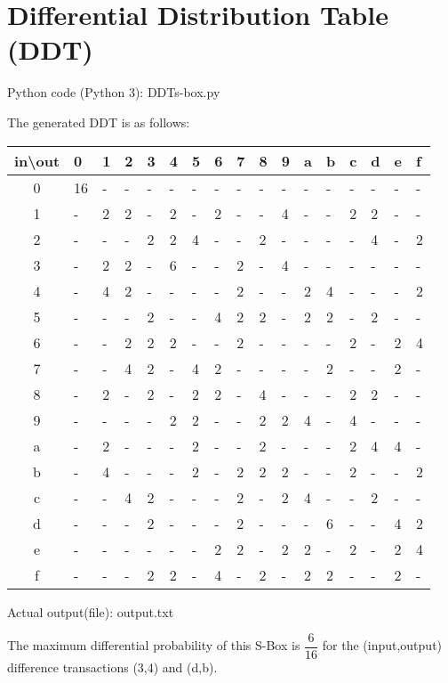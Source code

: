 \documentclass[12pt]{article}
\begin{document}
\section{Differential Distribution Table (DDT)}
\begin{large}

Python code (Python 3): DDT\textunderscore s-box.py



The generated DDT is as follows:
\begin{center}

\begin{tabular}{c||p{0.5cm}p{0.5cm}p{0.5cm}p{0.5cm}p{0.5cm}p{0.5cm}p{0.5cm}p{0.5cm}p{0.5cm}p{0.5cm}p{0.5cm}p{0.5cm}p{0.5cm}p{0.5cm}p{0.5cm}p{0.5cm}}

in\textbackslash out & 0 & 1 & 2 & 3 & 4 & 5 & 6 & 7 & 8 & 9 & a & b & c & d & e & f\\\hline
0& 16& -& -& -& -& -& -& -& -& -& -& -& -& -& -& - \\
1&  -& 2& 2& -& 2& -& 2& -& -& 4& -& -& 2& 2& -& - \\
2&  -& -& -& 2& 2& 4& -& -& 2& -& -& -& -& 4& -& 2 \\
3&  -& 2& 2& -& 6& -& -& 2& -& 4& -& -& -& -& -& - \\
4&  -& 4& 2& -& -& -& -& 2& -& -& 2& 4& -& -& -& 2 \\
5&  -& -& -& 2& -& -& 4& 2& 2& -& 2& 2& -& 2& -& - \\
6&  -& -& 2& 2& 2& -& -& 2& -& -& -& -& 2& -& 2& 4 \\
7&  -& -& 4& 2& -& 4& 2& -& -& -& -& 2& -& -& 2& - \\
8&  -& 2& -& 2& -& 2& 2& -& 4& -& -& -& 2& 2& -& - \\
9&  -& -& -& -& 2& 2& -& -& 2& 2& 4& -& 4& -& -& - \\
a&  -& 2& -& -& -& 2& -& -& 2& -& -& -& 2& 4& 4& - \\
b&  -& 4& -& -& -& 2& -& 2& 2& 2& -& -& 2& -& -& 2 \\
c&  -& -& 4& 2& -& -& -& 2& -& 2& 4& -& -& 2& -& - \\
d&  -& -& -& 2& -& -& -& 2& -& -& -& 6& -& -& 4& 2 \\
e&  -& -& -& -& -& -& 2& 2& -& 2& 2& -& 2& -& 2& 4 \\
f&  -& -& -& 2& 2& -& 4& -& 2& -& 2& 2& -& -& 2& - \\
\end{tabular}

\end{center}

Actual output(file): output.txt

The maximum differential probability of this S-Box is $\dfrac{6}{16}$ for the (input,output) difference transactions (3,4) and (d,b).

\end{large}
\end{document}
